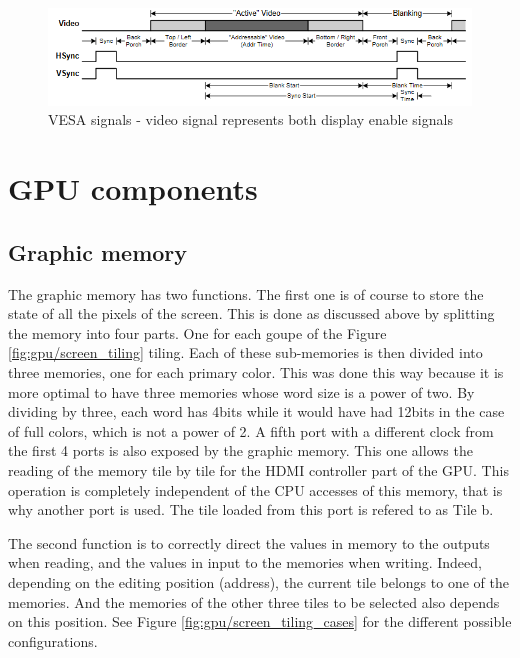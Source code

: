 \begin{figure}[H]
    \centering
    \includegraphics[width=\linewidth]{Chapter4-GPU_CLKU/res/vesa_signals.PNG}
    \caption{VESA signals - video signal represents both display enable signals}
    \label{fig:gpu/vesa_signals}
\end{figure}

\section{GPU components}

\subsection{Graphic memory}

The graphic memory has two functions. The first one is of course to store the state of all the 
pixels of the screen. This is done as discussed above by splitting the memory into four parts. One 
for each goupe of the Figure \ref{fig:gpu/screen_tiling} tiling. Each of these sub-memories is then 
divided into three memories, one for 
each primary color. This was done this way because it is more optimal to have three memories whose 
word size is a power of two. By dividing by three, each word has 4bits while it would have had 
12bits in the case of full colors, which is not a power of 2. A fifth port with a different clock 
from the first 4 ports is also exposed by the graphic memory. This one allows the reading of the 
memory tile by tile for the HDMI controller part of the GPU. This operation is completely independent
of the CPU accesses of this memory, that is why another port is used. The tile loaded from this port
is refered to as Tile b.

The second function is to correctly direct the values in memory to the outputs when reading, and 
the values in input to the memories when writing. Indeed, depending on the editing position (address), the 
current tile belongs to one of the memories. And the memories of the other three tiles to be 
selected also depends on this position. See Figure \ref{fig:gpu/screen_tiling_cases} for the different 
possible configurations. 

